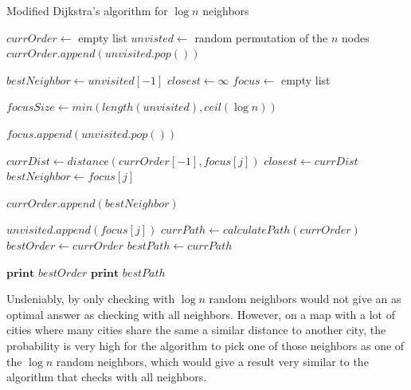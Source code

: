 \documentclass{article}
\begin{document}
\begin{algorithm}[H]
\caption{Modified Dijkstra's algorithm for $\log{n}$ neighbors}
\begin{algorithmic}

    \State $currOrder \gets $ empty list 
    \State $unvisted \gets $ random permutation of the $n$ nodes \Comment{\textcolor{blue}{$unvisited$ is a list}}
    \State $currOrder.append(unvisited.pop())$

        \State $bestNeighbor \gets unvisited[-1]$ 
        \State $closest \gets \infty $
        \State $focus \gets $ empty list  


        \State $focusSize \gets min(length(unvisited),ceil(\log{n}))$ 

            \State $focus.append(unvisited.pop())$ 
        \EndFor

            \State $currDist \gets distance(currOrder[-1],focus[j])$ 
                \State $closest \gets currDist$
                \State $bestNeighbor \gets focus[j]$
            \EndIf
        \EndFor

        \State $currOrder.append(bestNeighbor)$

                \State $unvisited.append(focus[j])$ \Comment{\textcolor{blue}{Put back all the unvisited cities to $unvisited$}}
            \EndIf
        \EndFor
    \EndFor
    \State $currPath \gets calculatePath(currOrder)$
        \State $bestOrder \gets currOrder$
        \State $bestPath \gets currPath$
    \EndIf
\EndWhile

\State $\textbf{print } bestOrder $
\State $\textbf{print } bestPath $

\end{algorithmic}
\end{algorithm}


\noindent
Undeniably, by only checking with $\log{n}$ random neighbors would not give an as optimal answer as checking with all neighbors. However, on a map with a lot of cities where many cities share the same a similar distance to another city, the probability is very high for the algorithm to pick one of those neighbors as one of the $\log{n}$ random neighbors, which would give a result very similar to the algorithm that checks with all neighbors.
\end{document}
